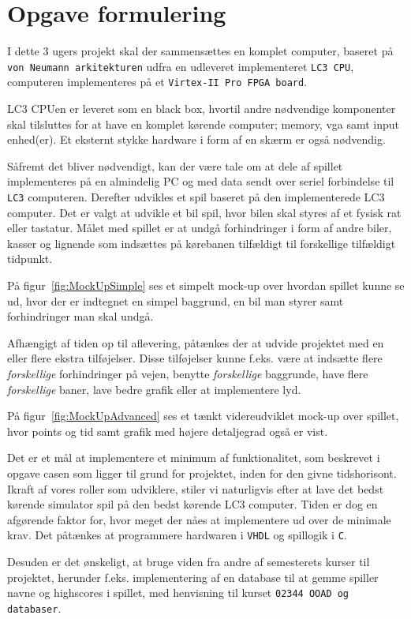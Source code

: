 \chapter{Opgave formulering}
I dette 3 ugers projekt skal der sammensættes en komplet computer, baseret på \texttt{von Neumann arkitekturen} udfra en udleveret implementeret \texttt{LC3 CPU}, computeren implementeres på et \texttt{Virtex-II Pro FPGA board}.

LC3 CPUen er leveret som en black box, hvortil andre nødvendige komponenter skal tilsluttes for at have en komplet kørende computer; memory, vga samt input enhed(er). Et eksternt stykke hardware i form af en skærm er også nødvendig.

Såfremt det bliver nødvendigt, kan der være tale om at dele af spillet implementeres på en almindelig PC og med data sendt over seriel forbindelse til \texttt{LC3} computeren. 
Derefter udvikles et spil baseret på den implementerede LC3 computer. Det er valgt at udvikle et bil spil, hvor bilen skal styres af et fysisk rat eller tastatur. Målet med spillet er at undgå forhindringer i form af andre biler, kasser og lignende som indsættes på kørebanen tilfældigt til forskellige tilfældigt tidpunkt.

På figur~\vref{fig:MockUpSimple} ses et simpelt mock-up over hvordan spillet kunne se ud, hvor der er indtegnet en simpel baggrund, en bil man styrer samt forhindringer man skal undgå.


Afhængigt af tiden op til aflevering, påtænkes der at udvide projektet med en eller flere ekstra tilføjelser. Disse tilføjelser kunne f.eks. være at indsætte flere \textit{forskellige} forhindringer på vejen, benytte \textit{forskellige} baggrunde, have flere \textit{forskellige} baner, lave bedre grafik eller at implementere lyd.

På figur~\vref{fig:MockUpAdvanced} ses et tænkt videreudviklet mock-up over spillet, hvor points og tid samt grafik med højere detaljegrad også er vist.


Det er et mål at implementere et minimum af funktionalitet, som beskrevet i opgave casen som ligger til grund for projektet, inden for den givne tidshorisont. Ikraft af vores roller som udviklere, stiler vi naturligvis efter at lave det bedst kørende simulator spil på den bedst kørende LC3 computer. Tiden er dog en afgørende faktor for, hvor meget der nåes at implementere ud over de minimale krav.
Det påtænkes at programmere hardwaren i \texttt{VHDL} og spillogik i \texttt{C}.

Desuden er det ønskeligt, at bruge viden fra andre af semesterets kurser til projektet, herunder f.eks. implementering af en database til at gemme spiller navne og highscores i spillet, med henvisning til kurset \texttt{02344 OOAD og databaser}.

